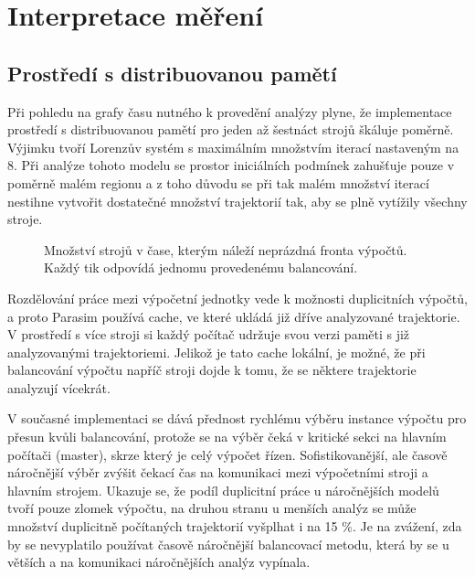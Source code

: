 \section{Interpretace měření}

\subsection{Prostředí s distribuovanou pamětí}

Při pohledu na grafy času nutného k provedění analýzy plyne, že implementace
prostředí s distribuovanou pamětí pro jeden až šestnáct strojů šká\-lu\-je poměrně. Výjimku tvoří
Lorenzův systém s maximálním množ\-stvím iterací nastaveným na 8. Při analýze tohoto modelu
se prostor iniciálních podmínek zahušťuje pouze v poměrně malém regionu a z toho důvodu se při tak
malém množství iterací nestihne vytvořit dostatečné množství trajektorií tak, aby se plně
vytížily všechny stroje. 

\begin{figure}[h!]
\begin{center}
\caption{Množství strojů v čase, kterým náleží neprázdná fronta výpočtů. Každý tik odpovídá jednomu provedenému balancování.}
\end{center}
\end{figure}

Rozdělování práce mezi výpočetní jednotky vede k možnosti du\-pli\-cit\-ních výpočtů,
a proto Parasim používá cache, ve které ukládá již dříve analyzované trajektorie.
V prostředí s více stroji si každý počítač udržuje svou verzi paměti s již
analyzovanými trajektoriemi. Jelikož je tato cache lokální, je možné, že při balancování
výpočtu napříč stroji dojde k tomu, že se některe trajektorie analyzují vícekrát.

V současné implementaci se dává přednost rychlému výběru instance výpočtu pro
přesun kvůli balancování, protože se na výběr čeká v kritické sekci na hlavním
počítači (master), skrze který je celý výpočet řízen. Sofistikovanější, ale časově
náročnější výběr zvýšit čekací čas na komunikaci mezi výpočetními stroji a hlavním strojem.
Ukazuje se, že podíl duplicitní práce u náročnějších modelů tvoří pouze zlomek výpočtu,
na druhou stranu u menších analýz se může množství duplicitně počítaných trajektorií
vyšplhat i na 15 \%. Je na zvážení, zda by se nevyplatilo používat časově náročnější
balancovací metodu, která by se u větších a na komunikaci náročnějších analýz vypínala.

